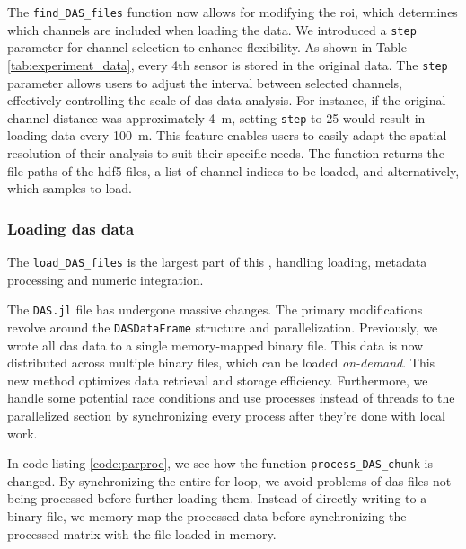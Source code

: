 The \texttt{find\_DAS\_files} function now allows for modifying the \acrfull{roi}, which determines which channels are included when loading the data. We introduced a \texttt{step} parameter for channel selection to enhance flexibility. As shown in Table \ref{tab:experiment_data}, every 4th sensor is stored in the original data. The \texttt{step} parameter allows users to adjust the interval between selected channels, effectively controlling the scale of \acrshort{das} data analysis. For instance, if the original channel distance was approximately \qty{4}{\meter}, setting \texttt{step} to 25 would result in loading data every \qty{100}{\meter}. This feature enables users to easily adapt the spatial resolution of their analysis to suit their specific needs.
The function returns the file paths of the \acrshort{hdf5} files, a list of channel indices to be loaded, and alternatively, which samples to load.

\subsubsection{Loading \acrshort{das} data}

The \lstinline{load_DAS_files} is the largest part of this , handling loading, metadata processing and numeric integration. 

The \texttt{DAS.jl} file has undergone massive changes. The primary modifications revolve around the \texttt{DASDataFrame} structure and parallelization. Previously, we wrote all \acrshort{das} data to a single memory-mapped binary file. This data is now distributed across multiple binary files, which can be loaded \textit{on-demand}. This new method optimizes data retrieval and storage efficiency. Furthermore, we handle some potential race conditions and use processes instead of threads to the parallelized section by synchronizing every process after they're done with local work. 




In code listing \ref{code:parproc}, we see how the function \texttt{process\_DAS\_chunk} is changed. By synchronizing the entire for-loop, we avoid problems of \acrshort{das} files not being processed before further loading them. Instead of directly writing to a binary file, we memory map the processed data before synchronizing the processed matrix with the file loaded in memory.

